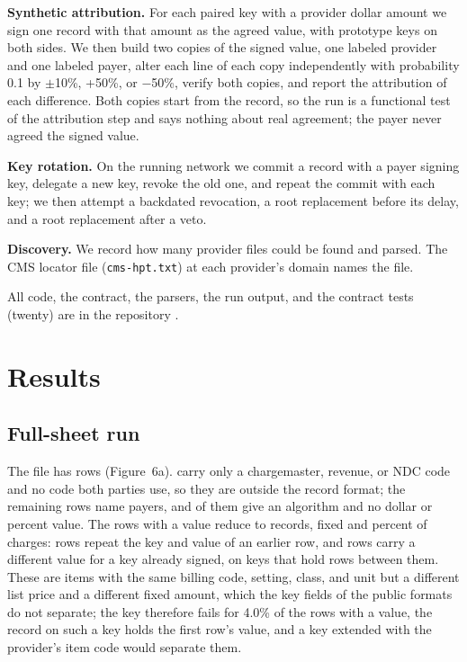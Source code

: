 \documentclass[10pt]{article}
\begin{document}
\textbf{Synthetic attribution.} For each paired key with a provider dollar amount we sign one record with that amount as the agreed value, with prototype keys on both sides. We then build two copies of the signed value, one labeled provider and one labeled payer, alter each line of each copy independently with probability 0.1 by $\pm$10\%, +50\%, or $-$50\%, verify both copies, and report the attribution of each difference. Both copies start from the record, so the run is a functional test of the attribution step and says nothing about real agreement; the payer never agreed the signed value.

\textbf{Key rotation.} On the running network we commit a record with a payer signing key, delegate a new key, revoke the old one, and repeat the commit with each key; we then attempt a backdated revocation, a root replacement before its delay, and a root replacement after a veto.

\textbf{Discovery.} We record how many provider files could be found and parsed. The CMS locator file (\texttt{cms-hpt.txt}) at each provider's domain names the file.

All code, the contract, the parsers, the run output, and the contract tests (twenty) are in the repository \cite{repo}.

\section*{Results}

\subsection*{Full-sheet run}

The file has \sheetRows{} rows (Figure~6a). \sheetNoCode{} carry only a chargemaster, revenue, or NDC code and no code both parties use, so they are outside the record format; the remaining \sheetLines{} rows name \sheetPayers{} payers, and \sheetAlgorithm{} of them give an algorithm and no dollar or percent value. The \sheetVerifyLines{} rows with a value reduce to \sheetRecords{} records, \sheetFixed{} fixed and \sheetPercent{} percent of charges: \sheetRepeats{} rows repeat the key and value of an earlier row, and \sheetCollisions{} rows carry a different value for a key already signed, on \sheetKeysMulti{} keys that hold \sheetRowsMulti{} rows between them. These are items with the same billing code, setting, class, and unit but a different list price and a different fixed amount, which the key fields of the public formats do not separate; the key therefore fails for 4.0\% of the rows with a value, the record on such a key holds the first row's value, and a key extended with the provider's item code would separate them.
\end{document}
